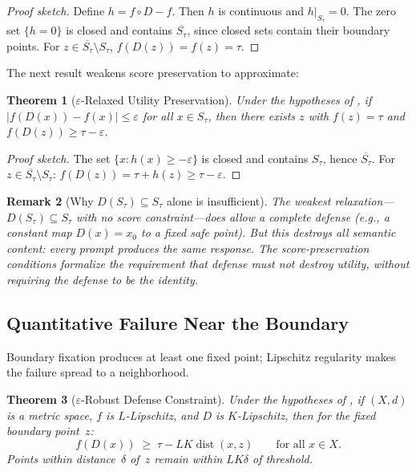 \documentclass[11pt]{article}
\newtheorem{theorem}{Theorem}[section]
\newtheorem{remark}[theorem]{Remark}
\newcommand{\cl}[1]{\overline{#1}}
\newcommand{\dist}{\operatorname{dist}}
\begin{document}
\begin{proof}[Proof sketch]
Define $h = f \circ D - f$. Then $h$ is continuous and $h|_{S_\tau} = 0$.
The zero set $\{h = 0\}$ is closed and contains $\cl{S_\tau}$, since closed sets contain their boundary points. For
$z \in \cl{S_\tau} \setminus S_\tau$, $f(D(z)) = f(z) = \tau$.
\end{proof}

The next result weakens score preservation to approximate:

\begin{theorem}[$\varepsilon$-Relaxed Utility Preservation]
\label{thm:eps-relaxed}
Under the hypotheses of , if
$|f(D(x)) - f(x)| \leq \varepsilon$ for all $x \in S_\tau$, then
there exists $z$ with $f(z) = \tau$ and
$f(D(z)) \geq \tau - \varepsilon$.
\end{theorem}

\begin{proof}[Proof sketch]
The set $\{x : h(x) \geq -\varepsilon\}$ is closed and contains
$S_\tau$, hence $\cl{S_\tau}$. For
$z \in \cl{S_\tau} \setminus S_\tau$:
$f(D(z)) = \tau + h(z) \geq \tau - \varepsilon$.
\end{proof}


\begin{remark}[Why $D(S_\tau) \subseteq S_\tau$ alone is insufficient]
\label{rem:safe-preserving-escape}
The weakest relaxation---$D(S_\tau) \subseteq S_\tau$ with no score
constraint---does allow a complete defense (e.g., a constant map
$D(x) = x_0$ to a fixed safe point). But this destroys all semantic
content: every prompt produces the same response. The score-preservation
conditions formalize the requirement that defense must not destroy
utility, without requiring the defense to be the identity.
\end{remark}


\subsection{Quantitative Failure Near the Boundary}
\label{sec:eps-robust}

Boundary fixation produces at least one fixed point; Lipschitz
regularity makes the failure spread to a neighborhood.

\begin{theorem}[$\varepsilon$-Robust Defense Constraint]
\label{thm:eps-robust}
Under the hypotheses of , if $(X,d)$ is a metric
space, $f$ is $L$-Lipschitz, and $D$ is $K$-Lipschitz, then for
the fixed boundary point~$z$:
\begin{equation}
  f(D(x)) \;\geq\; \tau - LK\dist(x, z)
  \qquad \text{for all } x \in X.
\end{equation}
Points within distance~$\delta$ of~$z$ remain within
$LK\delta$ of threshold.
\end{theorem}
\end{document}
